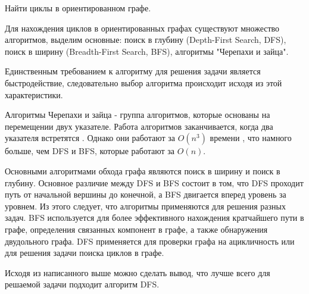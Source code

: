 \def\notedate{2022.11.29}
\def\currentauthor{Журавлев Н.В. (РК6-72Б)}

\begin{task}
Найти циклы в ориентированном графе.
\end{task}

Для нахождения циклов в ориентированных графах существуют множество алгоритмов, выделим основные: поиск в глубину (Depth-First Search, DFS), поиск в ширину (Breadth-First Search, BFS), алгоритмы "Черепахи и зайца".

Единственным требованием к алгоритму для решения задачи является быстродействие, следовательно выбор алгоритма происходит исходя из этой характеристики.

Алгоритмы Черепахи и зайца - группа алгоритмов, которые основаны на перемещении двух указателе. Работа алгоритмов заканчивается, когда два указателя встретятся \cite{alg-search}. Однако они работают за $O(n^3)$ времени \cite{alg-floyd}, что намного больше, чем DFS и BFS, которые работают за $O(n)$.

Основными алгоритмами обхода графа являются поиск в ширину и поиск в глубину. Основное различие между DFS и BFS состоит в том, что DFS проходит путь от начальной вершины до конечной, а BFS двигается вперед уровень за уровнем. Из этого следует, что алгоритмы применяются для решения разных задач. BFS используется для более эффективного нахождения кратчайшего пути в графе, определения связанных компонент в графе, а также обнаружения двудольного графа. DFS применяется для проверки графа на ацикличность или для решения задачи поиска циклов в графе.

Исходя из написанного выше можно сделать вывод, что лучше всего для решаемой задачи подходит алгоритм DFS.
\noteattributes{}
